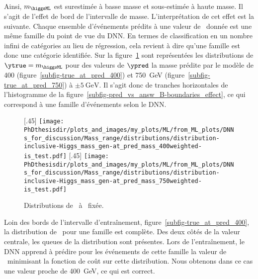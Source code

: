 \par
Ainsi, $m_{\higgsML}$ est surestimée à basse masse
et
sous-estimée à haute masse.
Il s'agit de l'effet de bord de l'intervalle de masse.
L'interprétation de cet effet est la suivante.
Chaque ensemble d'événements prédits à une valeur de \ypred\ donnée est une même famille du point de vue du DNN.
En termes de classification en un nombre infini de catégories au lieu de régression, cela revient à dire qu'une famille est donc une catégorie identifiée.
Sur la figure~\ref{fig-B-boundaries_effect-true_at_pred}
sont représentées les distributions de $\ytrue=m_{\higgsML}$
pour des valeurs de $\ypred$ la masse prédite par le modèle de
\num{400} (figure~\ref{subfig-true_at_pred_400}) et \SI{750}{\GeV} (figure~\ref{subfig-true_at_pred_750})
à $\pm\SI{5}{\GeV}$.
Il s'agit donc de tranches horizontales de l'histogramme de la figure~\ref{subfig-pred_vs_answ_B-boundaries_effect},
ce qui correspond à une famille d'événements selon le DNN.
\begin{figure}[h]
\centering

[.45\textwidth]
{\texttt{[image: \\PhDthesisdir/plots\_and\_images/my\_plots/ML/from\_ML\_plots/DNNs\_for\_discussion/Mass\_range/distributions/distribution-inclusive-Higgs\_mass\_gen-at\_pred\_mass\_400weighted-is\_test.pdf]}\vspace{-.5\baselineskip}}
\hfill
{}[.45\textwidth]
{\texttt{[image: \\PhDthesisdir/plots\_and\_images/my\_plots/ML/from\_ML\_plots/DNNs\_for\_discussion/Mass\_range/distributions/distribution-inclusive-Higgs\_mass\_gen-at\_pred\_mass\_750weighted-is\_test.pdf]}\vspace{-.5\baselineskip}}

\caption{Distributions de \ytrue\ à \ypred\ fixée.}
\label{fig-B-boundaries_effect-true_at_pred}
\end{figure}
\par
Loin des bords de l'intervalle d'entraînement,
figure~\ref{subfig-true_at_pred_400},
la distribution de \ytrue\ pour une famille est complète.
Des deux côtés de la valeur centrale, les queues de la distribution sont présentes.
Lors de l'entraînement,
le DNN \og apprend \fg{} à prédire pour les événements de cette famille
la valeur de \ypred\ minimisant la fonction de coût sur cette distribution.
Nous obtenons dans ce cas une valeur proche de \SI{400}{\GeV}, ce qui est correct.
